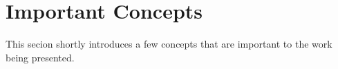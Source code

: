 \section{Important Concepts}
\label{sec:important-concepts}

This secion shortly introduces a few concepts that are important to the work being presented.

\incomplete





